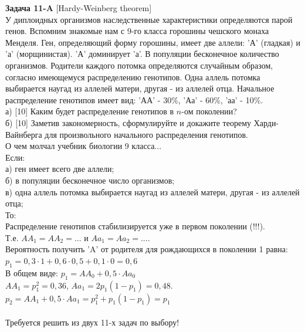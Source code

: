 \documentclass[12pt, a4paper]{article}\usepackage[]{graphicx}\usepackage[]{color}
\begin{document}
{\bf Задача 11-A} [Hardy-Weinberg theorem]\\
У диплоидных организмов наследственные характеристики определяются
парой генов. Вспомним знакомые нам с 9-го класса горошины чешского
монаха Менделя. Ген, определяющий форму горошины, имеет две
аллели:  'А' (гладкая) и 'а' (морщинистая). 'А' доминирует 'а'. В
популяции бесконечное количество организмов. Родители каждого
потомка определяются случайным образом, согласно имеющемуся
распределению генотипов. Одна аллель потомка выбирается наугад из
аллелей матери, другая - из аллелей отца. Начальное распределение
генотипов имеет вид: 'АА' - 30\%, 'Аа' - 60\%, 'аа' - 10\%. \\
а) [10] Каким будет распределение генотипов в $n$-ом поколении? \\
б) [10] Заметив закономерность, сформулируйте и докажите теорему
Харди-Вайнберга для произвольного начального распределения
генотипов. \\
О чем молчал учебник биологии 9 класса... \\
Если: \\
а) ген имеет всего две аллели; \\
б) в популяции бесконечное число организмов; \\
в) одна аллель потомка выбирается наугад из аллелей матери, другая
- из аллелей отца; \\
То: \\
Распределение генотипов стабилизируется уже в первом поколении
(!!!). \\
Т.е.
$AA_{1}=AA_{2}=...$ и $Aa_{1}=Aa_{2}=...$. \\
Вероятность получить 'A' от родителя для рождающихся в поколении 1
равна: $p_{1}=0,3\cdot 1+0,6\cdot 0,5 + 0,1\cdot 0=0,6$ \\
В общем виде: $p_{1}=AA_{0}+0,5\cdot Aa_{0}$ \\
$AA_{1}=p_{1}^{2}=0,36$, $Aa_{1}=2p_{1}(1-p_{1})=0,48$. \\
$p_{2}=AA_{1}+0,5\cdot Aa_{1}=p_{1}^{2}+p_{1}(1-p_{1})=p_{1}$ \\
\\


Требуется решить {\bf {}} из двух 11-х задач по
выбору! \\
\end{document}
